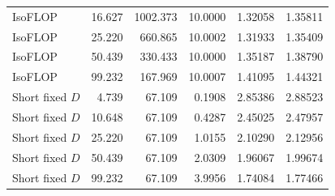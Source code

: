\documentclass{article}
\begin{document}
\begin{longtable}{lrrrrr}
IsoFLOP & 16.627 & 1002.373 & 10.0000 & 1.32058 & 1.35811\\
IsoFLOP & 25.220 & 660.865 & 10.0002 & 1.31933 & 1.35409\\
IsoFLOP & 50.439 & 330.433 & 10.0000 & 1.35187 & 1.38790\\
IsoFLOP & 99.232 & 167.969 & 10.0007 & 1.41095 & 1.44321\\
Short fixed $D$ & 4.739 & 67.109 & 0.1908 & 2.85386 & 2.88523\\
Short fixed $D$ & 10.648 & 67.109 & 0.4287 & 2.45025 & 2.47957\\
Short fixed $D$ & 25.220 & 67.109 & 1.0155 & 2.10290 & 2.12956\\
Short fixed $D$ & 50.439 & 67.109 & 2.0309 & 1.96067 & 1.99674\\
Short fixed $D$ & 99.232 & 67.109 & 3.9956 & 1.74084 & 1.77466\\
\bottomrule\end{longtable}
\end{document}
